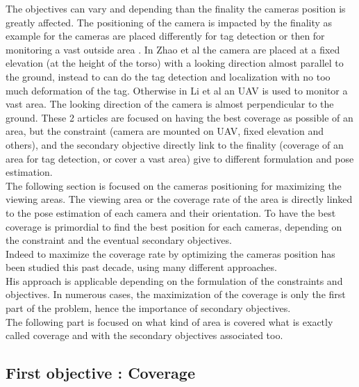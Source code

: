 The objectives can vary and depending than the finality the cameras position is greatly affected.
The positioning of the camera is impacted by the finality as example for the cameras are placed differently for tag detection \cite{22*zhao2008} or then for monitoring a vast outside area \cite{146*li2011}.  In Zhao et al \cite{22*zhao2008} the camera are placed at a fixed elevation (at the height of the torso) with a looking  direction almost parallel to the ground, instead to can do the tag detection and localization with no too much deformation of the tag. Otherwise in Li et al \cite{146*li2011} an UAV is used to monitor a vast area. The looking direction of the camera is almost perpendicular to the ground. These 2 articles are focused on having the best coverage as possible of an area, but the constraint (camera are mounted on UAV, fixed elevation and others), and the secondary objective directly link to the finality (coverage of an area for tag detection, or cover a vast area) give to different formulation and pose estimation.
\\
The following section is focused on the cameras positioning for maximizing the viewing areas. The viewing area or the coverage rate of the area is directly linked to the pose estimation of each camera and their orientation. To have the best coverage is primordial to find the best position for each cameras, depending on the constraint and the eventual secondary objectives.\\
Indeed to maximize the coverage rate by optimizing the cameras position has been studied this past decade, using many different approaches. \\
His approach is applicable depending on the formulation of the constraints and objectives. In numerous cases, the maximization of the coverage is only the first part of the problem, hence the importance of secondary objectives.\\
The following part is focused on what kind of area is covered what is exactly called coverage and with the secondary objectives associated too.

\subsection{First objective : Coverage }\label{sec:FirstObjCover}

